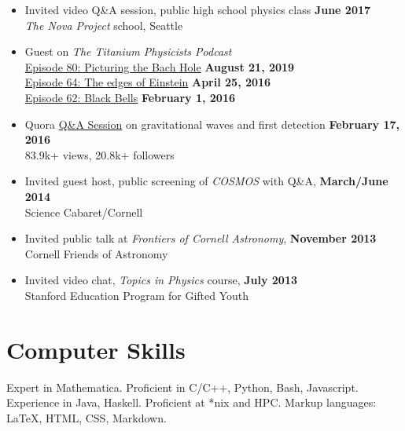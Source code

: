 \documentclass[margin,line]{res}
\begin{document}
\begin{resume}
\begin{itemize}
\item[] Invited video Q\&A session, public high school physics class \hfill {\bf June 2017} \\
\hspace*{1em} {\it The Nova Project} school, Seattle

\item[] Guest on {\it The Titanium Physicists Podcast} \\
\hspace*{1em}
\href{http://titaniumphysicists.brachiolopemedia.com/2019/08/21/episode-80-picturing-the-bach-hole-with-adal-rifai/}{Episode
  80: Picturing the Bach Hole}
\hfill
{\bf August 21, 2019} \\
\hspace*{1em} \href{http://titaniumphysicists.brachiolopemedia.com/2016/04/25/episode-64-e-and-n-the-edges-of-einstein/}{Episode 64: The edges of Einstein}
\hfill
{\bf April 25, 2016} \\
\hspace*{1em} \href{http://titaniumphysicists.brachiolopemedia.com/2016/02/01/episode-62-black-bells-with-brent-knopf-and-matt-sheehy/}{Episode 62: Black Bells}
\hfill
{\bf February 1, 2016} \\

\item[] Quora \href{https://www.quora.com/session/Leo-C-Stein/1}{Q\&A Session} on gravitational waves and first detection
  \hfill {\bf February 17, 2016} \\
\hspace*{1em} 83.9k+ views, 20.8k+ followers

\item[] Invited guest host, public screening of {\it COSMOS} with Q\&A,
  \hfill {\bf March/June 2014} \\
\hspace*{1em} Science Cabaret/Cornell
\item[] Invited public talk at {\it Frontiers of Cornell Astronomy}, \hfill {\bf November 2013} \\
\hspace*{1em} Cornell Friends of Astronomy
\item[] Invited video chat, {\it Topics in Physics} course, \hfill {\bf July 2013} \\
\hspace*{1em} Stanford Education Program for Gifted Youth
\end{itemize}

\section{\sc Computer Skills}
Expert in {\sc Mathematica}.
Proficient in C/C++, Python, Bash, Javascript.
Experience in Java, Haskell.
Proficient at *nix and HPC.
Markup languages: \LaTeX, HTML, CSS, Markdown.


\end{resume}
\end{document}
